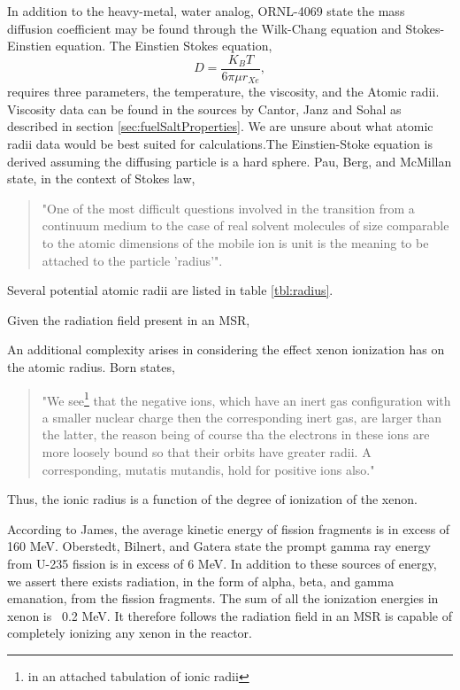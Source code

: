 In addition to the heavy-metal, water analog, ORNL-4069 state the mass diffusion coefficient may be found through the Wilk-Chang equation and Stokes-Einstien equation. \cite[p. 62]{ORNL4069}
The Einstien Stokes equation,
\begin{equation}
    D = \frac{K_B T}{6 \pi \mu r_{Xe} },
\end{equation}
requires three parameters, the temperature, the viscosity, and the Atomic radii. \cite[p. 127]{Cussler07}    Viscosity data can be found in the sources by Cantor, Janz and Sohal as described in section \ref{sec:fuelSaltProperties}.\cite{ORNLTM2316,Sohal2010,Janz2013} We are unsure about what atomic radii data would be best suited for calculations.The Einstien-Stoke equation is derived assuming the diffusing particle is a hard sphere. Pau, Berg, and McMillan state, in the context of Stokes law,
\begin{quote}
    "One of the most difficult questions involved in the transition from a continuum medium to the case of real solvent molecules of size comparable to the atomic dimensions of the mobile ion is unit is the meaning to be attached to the particle 'radius'". \cite{Pau90}
\end{quote}

Several potential atomic radii are listed in table \ref{tbl:radius}. 


Given the radiation field present in an MSR, 

An additional complexity arises in considering the effect xenon ionization has on the atomic radius.  Born states,

\begin{quote}
    "We see\footnote{in an attached tabulation of ionic radii } that the negative ions, which have an inert gas configuration with a smaller nuclear charge then the corresponding inert gas, are larger than the latter, the reason being of course tha the electrons in these ions are more loosely bound so that their orbits have greater radii.  A corresponding, mutatis mutandis, hold for positive ions also."
\end{quote}
Thus, the ionic radius is a function of the degree of ionization of the xenon. 

According to James, the average kinetic energy of fission fragments is in excess of 160 MeV. \cite{James69} Oberstedt, Bilnert, and Gatera state the prompt gamma ray energy from U-235 fission is in excess of 6 MeV.\cite[p. 86]{Oberstedt15}  In addition to these sources of energy, we assert there exists radiation, in the form of alpha, beta, and gamma emanation, from the fission fragments. The sum of all the ionization energies in xenon is ~0.2 MeV. \cite{NIST_XE}  It therefore follows the radiation field in an MSR is capable of completely ionizing any xenon in the reactor.

